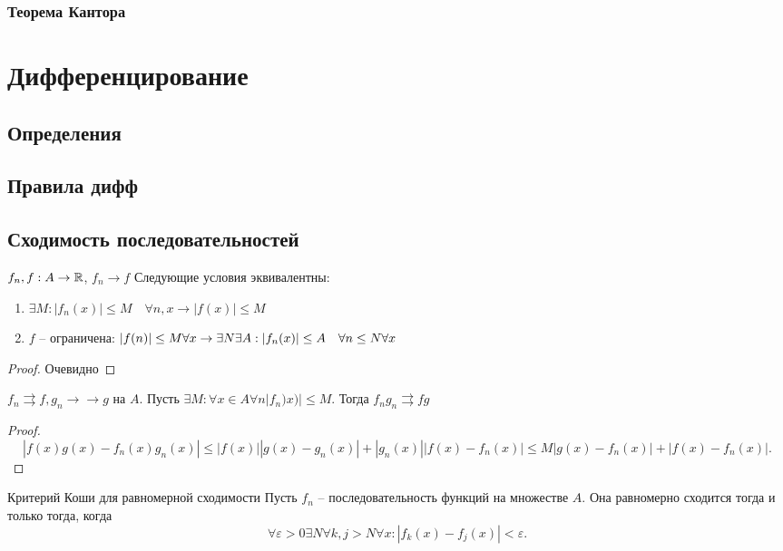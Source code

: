 \documentclass[12pt]{report}
\begin{document}
\subsection{Теорема Кантора}
\chapter{Дифференцирование}
\section{Определения}
\section{Правила дифф}
\section{Сходимость последовательностей}
\begin{thm}
    $f_n, f : A \to  \mathbb{R}$, $f_n \to  f$
    Следующие условия эквивалентны:
     \begin{enumerate}
	 \item $\exists M : |f_n(x)| \le  M \quad \forall  n, x \longrightarrow |f(x)| \le  M$
	 \item $f$ -- ограничена: $|f(n)| \le  M \forall  x \to \exists  N \exists  A: \\
	     |f_n(x)| \le A \quad \forall  n \le  N \forall  x$
    \end{enumerate}
\end{thm}
\begin{proof}
    Очевидно
\end{proof}
\begin{thm}
    $f_n \rightrightarrows  f, g_n \to  \to  g$ на $A$.
    Пусть $\exists M: \forall x \in A \forall  n |f_n)x) | \le  M$. Тогда  $f_n g_n \rightrightarrows fg$
\end{thm}
\begin{proof}
    \[
	|f(x) g(x) - f_n(x) g_n(x)| \le  |f(x) ||g(x) - g_n(x) | + | g_n(x)| |f(x) - f_n(x)| \le  M | g(x) - f_n(x)  |+ | f(x) - f_n(x)|
    .\]  
\end{proof}
\begin{thm}{Критерий Коши для равномерной сходимости}
    Пусть $f_n$ -- последовательность функций на множестве $A$. Она равномерно сходится  тогда и только тогда, когда  
    \[
	\forall  \varepsilon >0 \exists  N \forall  k, j> N \forall x : |f_k(x) - f_j(x)| < \varepsilon 
    .\] \label{usl}
\end{thm}
\end{document}
